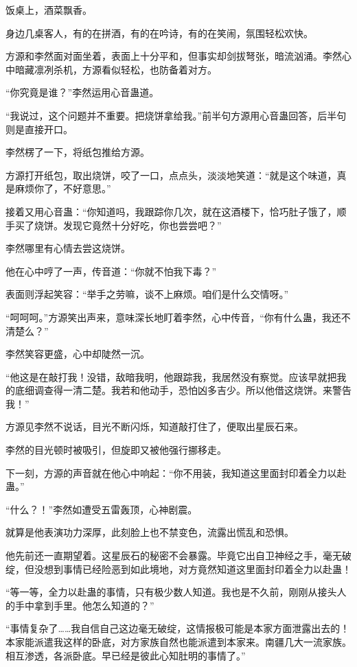 
\begin{this_body}

饭桌上，酒菜飘香。

身边几桌客人，有的在拼酒，有的在吟诗，有的在笑闹，氛围轻松欢快。

方源和李然面对面坐着，表面上十分平和，但事实却剑拔弩张，暗流汹涌。李然心中暗藏凛冽杀机，方源看似轻松，也防备着对方。

“你究竟是谁？”李然运用心音蛊道。

“我说过，这个问题并不重要。把烧饼拿给我。”前半句方源用心音蛊回答，后半句则是直接开口。

李然楞了一下，将纸包推给方源。

方源打开纸包，取出烧饼，咬了一口，点点头，淡淡地笑道：“就是这个味道，真是麻烦你了，不好意思。”

接着又用心音蛊：“你知道吗，我跟踪你几次，就在这酒楼下，恰巧肚子饿了，顺手买了烧饼。发现它竟然十分好吃，你也尝尝吧？”

李然哪里有心情去尝这烧饼。

他在心中哼了一声，传音道：“你就不怕我下毒？”

表面则浮起笑容：“举手之劳嘛，谈不上麻烦。咱们是什么交情呀。”

“呵呵呵。”方源笑出声来，意味深长地盯着李然，心中传音，“你有什么蛊，我还不清楚么？”

李然笑容更盛，心中却陡然一沉。

“他这是在敲打我！没错，敌暗我明，他跟踪我，我居然没有察觉。应该早就把我的底细调查得一清二楚。我若和他动手，恐怕凶多吉少。所以他借这烧饼。来警告我！”

方源见李然不说话，目光不断闪烁，知道敲打住了，便取出星辰石来。

李然的目光顿时被吸引，但旋即又被他强行挪移走。

下一刻，方源的声音就在他心中响起：“你不用装，我知道这里面封印着全力以赴蛊。”

“什么？！”李然如遭受五雷轰顶，心神剧震。

就算是他表演功力深厚，此刻脸上也不禁变色，流露出慌乱和恐惧。

他先前还一直期望着。这星辰石的秘密不会暴露。毕竟它出自卫神经之手，毫无破绽，但没想到事情已经险恶到如此境地，对方竟然知道这里面封印着全力以赴蛊！

“等一等，全力以赴蛊的事情，只有极少数人知道。我也是不久前，刚刚从接头人的手中拿到手里。他怎么知道的？”

“事情复杂了……我自信自己这边毫无破绽，这情报极可能是本家方面泄露出去的！本家能派遣我这样的卧底，对方家族自然也能派遣到本家来。南疆几大一流家族。相互渗透，各派卧底。早已经是彼此心知肚明的事情了。”


\end{this_body}
